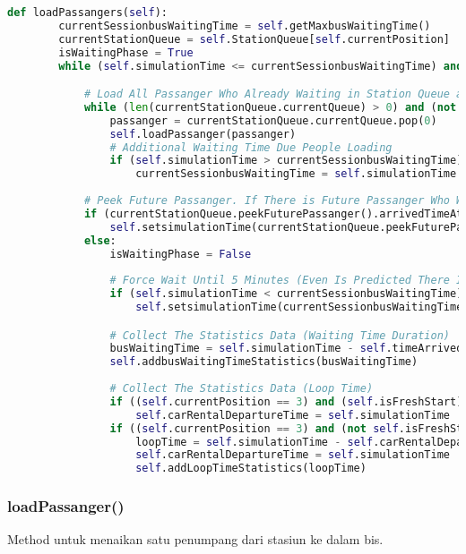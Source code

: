 \documentclass{article}
\begin{document}
\begin{lstlisting}[language=Python]
def loadPassangers(self):
		currentSessionbusWaitingTime = self.getMaxbusWaitingTime()
		currentStationQueue = self.StationQueue[self.currentPosition]
		isWaitingPhase = True
		while (self.simulationTime <= currentSessionbusWaitingTime) and (not self.isFull()) and (isWaitingPhase):

			# Load All Passanger Who Already Waiting in Station Queue as Long Bus is Not Full
			while (len(currentStationQueue.currentQueue) > 0) and (not self.isFull()):
				passanger = currentStationQueue.currentQueue.pop(0)
				self.loadPassanger(passanger)
				# Additional Waiting Time Due People Loading
				if (self.simulationTime > currentSessionbusWaitingTime):
					currentSessionbusWaitingTime = self.simulationTime
			
			# Peek Future Passanger. If There is Future Passanger Who Will Come Faster Before WaitTime Ends. Wait. If No. Wait Until WaitTime Ends. Then Go..
			if (currentStationQueue.peekFuturePassanger().arrivedTimeAtOriginStation <= currentSessionbusWaitingTime):
				self.setsimulationTime(currentStationQueue.peekFuturePassanger().arrivedTimeAtOriginStation)
			else:
				isWaitingPhase = False
				
				# Force Wait Until 5 Minutes (Even Is Predicted There Is No Passanger Will Come Anyway)
				if (self.simulationTime < currentSessionbusWaitingTime):
					self.setsimulationTime(currentSessionbusWaitingTime)

				# Collect The Statistics Data (Waiting Time Duration)	
				busWaitingTime = self.simulationTime - self.timeArrivedAtStation
				self.addbusWaitingTimeStatistics(busWaitingTime)
				
				# Collect The Statistics Data (Loop Time)
				if ((self.currentPosition == 3) and (self.isFreshStart)):
					self.carRentalDepartureTime = self.simulationTime
				if ((self.currentPosition == 3) and (not self.isFreshStart)):
					loopTime = self.simulationTime - self.carRentalDepartureTime
					self.carRentalDepartureTime = self.simulationTime
					self.addLoopTimeStatistics(loopTime)

\end{lstlisting}


\pagebreak
\subsubsection{loadPassanger()}
Method untuk menaikan satu penumpang dari stasiun ke dalam bis.
\end{document}
